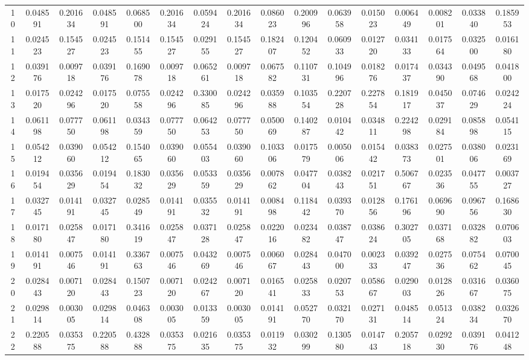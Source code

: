 \documentclass{article}
\begin{document}
\begin{landscape}
\begin{table}[htbp]
\begin{tabular}{cccccccccccccccc}
10 & 0.048591 & 0.201634 & 0.048591 & 0.068500 & 0.201634 & 0.059424 & 0.201634 & 0.086023 & 0.200996 & 0.063958 & 0.015023 & 0.006449 & 0.008201 & 0.033840 & 0.185953 \\
11 & 0.024523 & 0.154527 & 0.024523 & 0.151455 & 0.154527 & 0.029155 & 0.154527 & 0.182407 & 0.120452 & 0.060933 & 0.012720 & 0.034133 & 0.017564 & 0.032500 & 0.016180 \\
12 & 0.039176 & 0.009718 & 0.039176 & 0.169078 & 0.009718 & 0.065261 & 0.009718 & 0.067582 & 0.110731 & 0.104996 & 0.018276 & 0.017437 & 0.034390 & 0.049568 & 0.041800 \\
13 & 0.017520 & 0.024296 & 0.017520 & 0.075558 & 0.024296 & 0.330085 & 0.024296 & 0.035988 & 0.103554 & 0.220728 & 0.227854 & 0.181917 & 0.045037 & 0.074629 & 0.024224 \\
14 & 0.061198 & 0.077750 & 0.061198 & 0.034359 & 0.077750 & 0.064253 & 0.077750 & 0.050069 & 0.140287 & 0.010442 & 0.034811 & 0.224298 & 0.029184 & 0.085898 & 0.054115 \\
15 & 0.054212 & 0.039060 & 0.054212 & 0.154065 & 0.039060 & 0.055403 & 0.039060 & 0.103306 & 0.017579 & 0.005006 & 0.015442 & 0.038373 & 0.027501 & 0.038006 & 0.023169 \\
16 & 0.019454 & 0.035629 & 0.019454 & 0.183032 & 0.035629 & 0.053359 & 0.035629 & 0.007862 & 0.047704 & 0.038243 & 0.021751 & 0.506767 & 0.023536 & 0.047755 & 0.003727 \\
17 & 0.032745 & 0.014191 & 0.032745 & 0.028549 & 0.014191 & 0.035532 & 0.014191 & 0.008498 & 0.118442 & 0.039370 & 0.012856 & 0.176196 & 0.069690 & 0.096756 & 0.168630 \\
18 & 0.017180 & 0.025847 & 0.017180 & 0.341619 & 0.025847 & 0.037128 & 0.025847 & 0.022016 & 0.023482 & 0.038747 & 0.038624 & 0.302705 & 0.037168 & 0.032882 & 0.070603 \\
19 & 0.014191 & 0.007546 & 0.014191 & 0.336763 & 0.007546 & 0.043269 & 0.007546 & 0.006067 & 0.028443 & 0.047000 & 0.002333 & 0.039247 & 0.027536 & 0.075462 & 0.070045 \\
20 & 0.028443 & 0.007120 & 0.028443 & 0.150723 & 0.007120 & 0.024267 & 0.007120 & 0.016541 & 0.025833 & 0.020753 & 0.058667 & 0.029003 & 0.012826 & 0.031667 & 0.036075 \\
21 & 0.029814 & 0.003005 & 0.029814 & 0.046308 & 0.003005 & 0.013359 & 0.003005 & 0.014191 & 0.052770 & 0.032170 & 0.027131 & 0.048514 & 0.051324 & 0.038234 & 0.032670 \\
22 & 0.220588 & 0.035375 & 0.220588 & 0.432888 & 0.035375 & 0.021635 & 0.035375 & 0.011932 & 0.030299 & 0.130580 & 0.014743 & 0.205718 & 0.029230 & 0.039176 & 0.041248 \\

\end{tabular}
\end{table}
\end{landscape}
\end{document}
